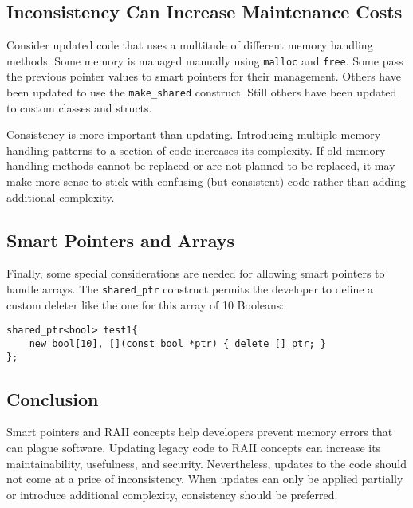 \subsection{Inconsistency Can Increase Maintenance Costs}

Consider updated code that uses a multitude of different memory handling methods. Some memory is managed manually using \texttt{malloc} and \texttt{free}. Some pass the previous pointer values to smart pointers for their management. Others have been updated to use the \texttt{make\_shared} construct. Still others have been updated to custom classes and structs.

Consistency is more important than updating. Introducing multiple memory handling patterns to a section of code increases its complexity. If old memory handling methods cannot be replaced or are not planned to be replaced, it may make more sense to stick with confusing (but consistent) code rather than adding additional complexity.

\subsection{Smart Pointers and Arrays}

Finally, some special considerations are needed for allowing smart pointers to handle arrays. The \texttt{shared\_ptr} construct permits the developer to define a custom deleter like the one for this array of 10 Booleans:

\begin{lstlisting}[caption={Custom Deleter},captionpos=b,style=CStyle,basicstyle=\small]
shared_ptr<bool> test1{
	new bool[10], [](const bool *ptr) { delete [] ptr; }
};
\end{lstlisting}

\subsection{Conclusion}

Smart pointers and RAII concepts help developers prevent memory errors that can plague software. Updating legacy code to RAII concepts can increase its maintainability, usefulness, and security. Nevertheless, updates to the code should not come at a price of inconsistency. When updates can only be applied partially or introduce additional complexity, consistency should be preferred.

